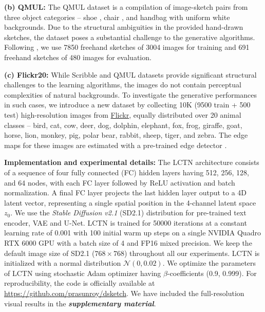 \vspace{0.5em}

\noindent
\textbf{(b) QMUL:} The QMUL dataset is a compilation \cite{xiang2022adversarial} of image-sketch pairs from three object categories -- shoe \cite{yu2016sketch}, chair \cite{yu2016sketch}, and handbag \cite{song2017deep} with uniform white backgrounds. Due to the structural ambiguities in the provided hand-drawn sketches, the dataset poses a substantial challenge to the generative algorithms. Following \cite{xiang2022adversarial}, we use 7850 freehand sketches of 3004 images for training and 691 freehand sketches of 480 images for evaluation.

\vspace{0.5em}

\noindent
\textbf{(c) Flickr20:} While Scribble \cite{ghosh2019interactive} and QMUL \cite{song2017deep,yu2016sketch} datasets provide significant structural challenges to the learning algorithms, the images do not contain perceptual complexities of natural backgrounds. To investigate the generative performances in such cases, we introduce a new dataset by collecting 10K (9500 train + 500 test) high-resolution images from \href{https://www.flickr.com/}{Flickr}, equally distributed over 20 animal classes -- bird, cat, cow, deer, dog, dolphin, elephant, fox, frog, giraffe, goat, horse, lion, monkey, pig, polar bear, rabbit, sheep, tiger, and zebra. The edge maps for these images are estimated with a pre-trained edge detector \cite{su2021pixel}.

\vspace{0.5em}

\noindent
\textbf{Implementation and experimental details:} The LCTN architecture consists of a sequence of four fully connected (FC) hidden layers having 512, 256, 128, and 64 nodes, with each FC layer followed by ReLU activation and batch normalization. A final FC layer projects the last hidden layer output to a 4D latent vector, representing a single spatial position in the 4-channel latent space $z_0$. We use the \emph{Stable Diffusion v2.1} (SD2.1) distribution for pre-trained text encoder, VAE and U-Net. LCTN is trained for 50000 iterations at a constant learning rate of 0.001 with 100 initial warm up steps on a single NVIDIA Quadro RTX 6000 GPU with a batch size of 4 and FP16 mixed precision. We keep the default image size of SD2.1 ($768 \times 768$) throughout all our experiments. LCTN is initialized with a normal distribution $\mathcal{N}(0, 0.02)$. We optimize the parameters of LCTN using stochastic Adam optimizer \cite{kingma2015adam} having $\beta$-coefficients (0.9, 0.999). For reproducibility, the code is officially available at \url{https://github.com/prasunroy/dsketch}. We have included the full-resolution visual results in the \textbf{\emph{supplementary material}}.

